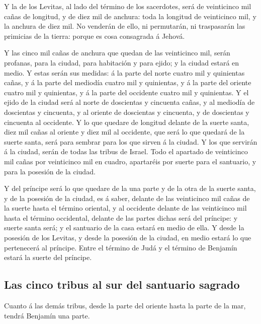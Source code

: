  Y la de los Levitas, al lado del término de los
sacerdotes, será de veinticinco mil cañas de longitud, y de diez mil de
anchura: toda la longitud de veinticinco mil, y la anchura de diez mil.
 No venderán de ello, ni permutarán, ni traspasarán las
primicias de la tierra: porque es cosa consagrada á Jehová.

 Y las cinco mil cañas de anchura que quedan de las
veinticinco mil, serán profanas, para la ciudad, para habitación y para
ejido; y la ciudad estará en medio.  Y estas serán sus
medidas: á la parte del norte cuatro mil y quinientas cañas, y á la
parte del mediodía cuatro mil y quinientas, y á la parte del oriente
cuatro mil y quinientas, y á la parte del occidente cuatro mil y
quinientas.  Y el ejido de la ciudad será al norte de
doscientas y cincuenta cañas, y al mediodía de doscientas y cincuenta, y
al oriente de doscientas y cincuenta, y de doscientas y cincuenta al
occidente.  Y lo que quedare de longitud delante de la
suerte santa, diez mil cañas al oriente y diez mil al occidente, que
será lo que quedará de la suerte santa, será para sembrar para los que
sirven á la ciudad.  Y los que servirán á la ciudad, serán
de todas las tribus de Israel.  Todo el apartado de
veinticinco mil cañas por veinticinco mil en cuadro, apartaréis por
suerte para el santuario, y para la posesión de la ciudad.

 Y del príncipe será lo que quedare de la una parte y de la
otra de la suerte santa, y de la posesión de la ciudad, es á saber,
delante de las veinticinco mil cañas de la suerte hasta el término
oriental, y al occidente delante de las veinticinco mil hasta el término
occidental, delante de las partes dichas será del príncipe: y suerte
santa será; y el santuario de la casa estará en medio de ella.
 Y desde la posesión de los Levitas, y desde la posesión de
la ciudad, en medio estará lo que pertenecerá al príncipe. Entre el
término de Judá y el término de Benjamín estará la suerte del príncipe.

\hypertarget{las-cinco-tribus-al-sur-del-santuario-sagrado}{%
\subsection{Las cinco tribus al sur del santuario
sagrado}\label{las-cinco-tribus-al-sur-del-santuario-sagrado}}

 Cuanto á las demás tribus, desde la parte del oriente
hasta la parte de la mar, tendrá Benjamín una parte.


